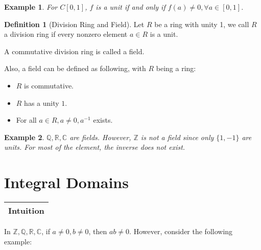\documentclass{article}
\theoremstyle{MyNonumberplain}
\theoremstyle{break}
\theoremstyle{break}
\newtheorem{example}{Example}[section]
\theoremstyle{break}
\theoremstyle{definition}
\theoremstyle{break}
\newtheorem{definition}{Definition}[section]
\begin{document}
\begin{expbox}
    \begin{example}
        For $C [0, 1]$, $f$ is a unit if and only if $f (a) \neq 0, \forall a \in [0, 1]$.
    \end{example}
\end{expbox}

\begin{defbox}
    \begin{definition}[Division Ring and Field]
        Let $R$ be a ring with unity 1, we call $R$ a division ring if every nonzero
        element $a \in R$ is a unit.\bigskip
        
        A commutative division ring is called a field.\bigskip
        
        Also, a field can be defined as following, with $R$ being a ring:\\
        \begin{itemize}
          \item $R$ is commutative.\bigskip
          
          \item $R$ has a unity $1$.\bigskip
          
          \item For all $a \in R, a \neq 0, a^{- 1}$ exists.
        \end{itemize}
    \end{definition}
\end{defbox}

\begin{expbox}
    \begin{example}
        $\mathbb{Q}, \mathbb{R}, \mathbb{C}$ are fields. However, $\mathbb{Z}$ is not a field since only $\{1,-1\}$ are units. For most of the element, the inverse does not exist.
    \end{example}
\end{expbox}

\newpage

\section{Integral Domains}

\begin{tabular}{|c|}
    \hline
    Intuition\\
    \hline
  \end{tabular}
  
  In $\mathbb{Z}, \mathbb{Q}, \mathbb{R}, \mathbb{C}$, if $a \neq 0, b \neq 0$,
  then $a b \neq 0$. However, consider the following example:
  
\end{document}
